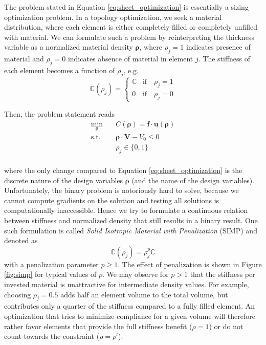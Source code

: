 The problem stated in Equation \eqref{eq:sheet_optimization} is essentially a sizing optimization problem. In a topology optimization, we seek a material distribution, where each element is either completely filled or completely unfilled with material. We can formulate such a problem by reinterpreting the thickness variable as a normalized material density $\pmb{\rho}$, where $\rho_j=1$ indicates presence of material and $\rho_j=0$ indicates absence of material in element $j$. The stiffness of each element becomes a function of $\rho_j$, e.g. 
\begin{equation}
    \mathbb{C}(\rho_j)=
    \begin{cases}
        \mathbb{C} & \text{if} \quad \rho_j = 1 \\
        0          & \text{if} \quad \rho_j = 0
    \end{cases}
\end{equation}

Then, the problem statement reads
\begin{equation}
    \begin{aligned}
        \min_{\pmb{\rho}} \quad & C(\pmb{\rho}) = \mathbf{f} \cdot \mathbf{u}(\pmb{\rho})\\
        \textrm{s.t.} \quad & \pmb{\rho} \cdot \mathbf{V} - V_0 \le 0  \\
                            & \rho_j \in \{0, 1\}\\
    \end{aligned}
    \label{eq:topology_optimization}
\end{equation}

where the only change compared to Equation \eqref{eq:sheet_optimization} is the discrete nature of the design variables $\pmb{\rho}$ (and the name of the design variables). Unfortunately, the binary problem is notoriously hard to solve, because we cannot compute gradients on the solution and testing all solutions is computationally inaccessible. Hence we try to formulate a continuous relation between stiffness and normalized density that still results in a binary result. One such formulation is called \emph{Solid Isotropic Material with Penalization} (SIMP) and denoted as 
\begin{equation}
    \mathbb{C}(\rho_j)= \rho_j^p \mathbb{C}
\end{equation}
with a penalization parameter $p \ge 1$. 
The effect of penalization is shown in Figure \ref{fig:simp} for typical values of $p$. We may observe for $p>1$ that the stiffness per invested material is unattractive for intermediate density values. For example, choosing $\rho_j=0.5$ adds half an element volume to the total volume, but contributes only a quarter of the stiffness compared to a fully filled element. An optimization that tries to minimize compliance for a given volume will therefore rather favor elements that provide the full stiffness benefit ($\rho=1$) or do not count towards the constraint ($\rho=\rho^l$). 

